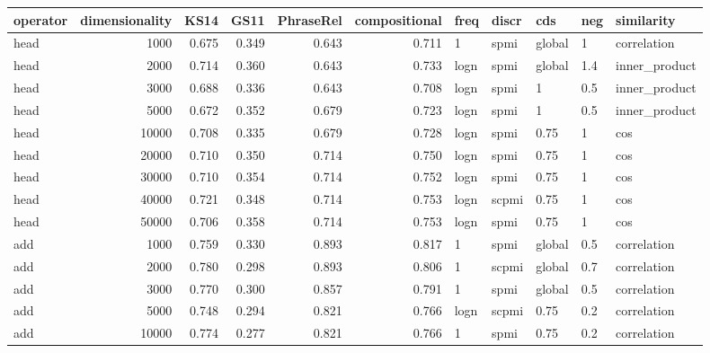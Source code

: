 \begin{tabular}{lrrrrrlllll}
\toprule
operator &  dimensionality &   KS14 &   GS11 &  PhraseRel &  compositional &  freq &  discr &     cds &  neg &     similarity \\
\midrule
    head &            1000 &  0.675 &  0.349 &      0.643 &          0.711 &     1 &   spmi &  global &    1 &    correlation \\
    head &            2000 &  0.714 &  0.360 &      0.643 &          0.733 &  logn &   spmi &  global &  1.4 &  inner\_product \\
    head &            3000 &  0.688 &  0.336 &      0.643 &          0.708 &  logn &   spmi &       1 &  0.5 &  inner\_product \\
    head &            5000 &  0.672 &  0.352 &      0.679 &          0.723 &  logn &   spmi &       1 &  0.5 &  inner\_product \\
    head &           10000 &  0.708 &  0.335 &      0.679 &          0.728 &  logn &   spmi &    0.75 &    1 &            cos \\
    head &           20000 &  0.710 &  0.350 &      0.714 &          0.750 &  logn &   spmi &    0.75 &    1 &            cos \\
    head &           30000 &  0.710 &  0.354 &      0.714 &          0.752 &  logn &   spmi &    0.75 &    1 &            cos \\
    head &           40000 &  0.721 &  0.348 &      0.714 &          0.753 &  logn &  scpmi &    0.75 &    1 &            cos \\
    head &           50000 &  0.706 &  0.358 &      0.714 &          0.753 &  logn &   spmi &    0.75 &    1 &            cos \\
     add &            1000 &  0.759 &  0.330 &      0.893 &          0.817 &     1 &   spmi &  global &  0.5 &    correlation \\
     add &            2000 &  0.780 &  0.298 &      0.893 &          0.806 &     1 &  scpmi &  global &  0.7 &    correlation \\
     add &            3000 &  0.770 &  0.300 &      0.857 &          0.791 &     1 &   spmi &  global &  0.5 &    correlation \\
     add &            5000 &  0.748 &  0.294 &      0.821 &          0.766 &  logn &  scpmi &    0.75 &  0.2 &    correlation \\
     add &           10000 &  0.774 &  0.277 &      0.821 &          0.766 &     1 &   spmi &    0.75 &  0.2 &    correlation \\

\end{tabular}
